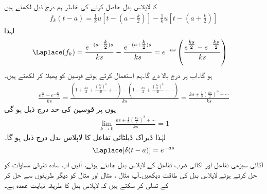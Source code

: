  کا لاپلاس بدل حاصل کرنے کی خاطر ہم درج ذیل لکھتے ہیں
\begin{align*}
f_k(t-a)=\frac{1}{k}u[t-(a-\tfrac{k}{2})]-\frac{1}{k}u[t-(a+\tfrac{k}{2})]
\end{align*}
لہٰذا
\begin{align*}
\Laplace(f_k)&=\frac{e^{-(a-\tfrac{k}{2})s}}{ks}-\frac{e^{-(a+\tfrac{k}{2})s}}{ks}=e^{-as}\left(\frac{e^{\tfrac{ks}{2}}-e^{-\tfrac{ks}{2}}}{ks}\right)
\end{align*}
ہو گا۔اب  پر درج بالا  دے گا۔ہم  استعمال کرتے ہوئے  قوسین کو پھیلا کر لکھتے ہیں۔
\begin{align*}
\frac{e^{\tfrac{ks}{2}}-e^{-\tfrac{ks}{2}}}{ks}=\frac{(1+\tfrac{ks}{2}+\tfrac{(\tfrac{ks}{2})^2}{2!}+\cdots)-(1-\tfrac{ks}{2}+\tfrac{(\tfrac{ks}{2})^2}{2!}-\cdots)}{ks}=\frac{ks+\tfrac{1}{3}(\tfrac{ks}{2})^3+\cdots}{ks}
\end{align*}
یوں  پر قوسین کی حد درج ذیل ہو گی
\begin{align*}
\lim_{k \to 0} \frac{ks+\tfrac{1}{3}(\tfrac{ks}{2})^3+\cdots}{ks}=1
\end{align*}
لہٰذا ڈیراک ڈیلٹائی تفاعل کا لاپلاس بدل درج ذیل ہو گا۔
\begin{align}\label{مساوات_لاپلاس_اکائی_ضرب_کا_بدل}
\Laplace[\delta(t-a)]=e^{-as}
\end{align}
اکائی سیڑھی تفاعل اور اکائی ضرب تفاعل کے لاپلاس بدل جانتے ہوئے، آئیں اب سادہ تفرقی مساوات کو حل کرتے ہوئے لاپلاس بدل کی طاقت دیکھیں۔آپ مثال ، مثال  اور مثال  کو دیگر طریقوں سے حل کر کے تسلی کر سکتے ہیں کہ لاپلاس بدل کا طریقہ نہایت عمدہ ہے۔ 

